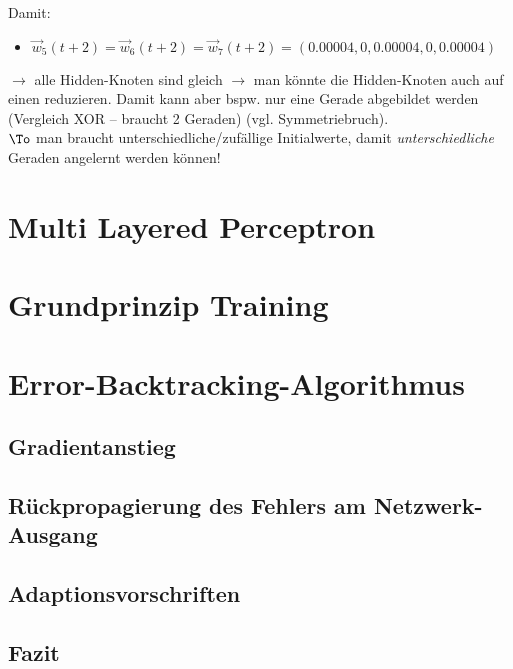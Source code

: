 Damit:
\begin{itemize}
\item $\vec{w}_5(t+2)=\vec{w}_6(t+2)=\vec{w}_7(t+2)=(0.00004, 0, 0.00004, 0, 0.00004)$
\end{itemize}
$\to$ alle Hidden-Knoten sind gleich $\to$ man könnte die Hidden-Knoten auch auf einen reduzieren. Damit kann aber bspw. nur eine Gerade abgebildet werden (Vergleich XOR -- braucht 2 Geraden) (vgl. Symmetriebruch).\\
$\To$ man braucht unterschiedliche/zufällige Initialwerte, damit \emph{unterschiedliche} Geraden angelernt werden können!

\section{Multi Layered Perceptron}

\section{Grundprinzip Training}

\section{Error-Backtracking-Algorithmus}
\subsection{Gradientanstieg}
\subsection{Rückpropagierung des Fehlers am Netzwerk-Ausgang}
\subsection{Adaptionsvorschriften}
\subsection{Fazit}

